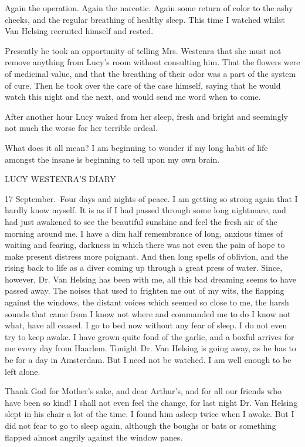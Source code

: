 Again the operation. Again the narcotic. Again some return of color to the ashy cheeks, and the regular breathing of healthy sleep. This time I watched whilst Van Helsing recruited himself and rested. 

Presently he took an opportunity of telling Mrs. Westenra that she must not remove anything from Lucy's room without consulting him. That the flowers were of medicinal value, and that the breathing of their odor was a part of the system of cure. Then he took over the care of the case himself, saying that he would watch this night and the next, and would send me word when to come. 

After another hour Lucy waked from her sleep, fresh and bright and seemingly not much the worse for her terrible ordeal. 

What does it all mean? I am beginning to wonder if my long habit of life amongst the insane is beginning to tell upon my own brain. 

LUCY WESTENRA'S DIARY 

17 September.--Four days and nights of peace. I am getting so strong again that I hardly know myself. It is as if I had passed through some long nightmare, and had just awakened to see the beautiful sunshine and feel the fresh air of the morning around me. I have a dim half remembrance of long, anxious times of waiting and fearing, darkness in which there was not even the pain of hope to make present distress more poignant. And then long spells of oblivion, and the rising back to life as a diver coming up through a great press of water. Since, however, Dr. Van Helsing has been with me, all this bad dreaming seems to have passed away. The noises that used to frighten me out of my wits, the flapping against the windows, the distant voices which seemed so close to me, the harsh sounds that came from I know not where and commanded me to do I know not what, have all ceased. I go to bed now without any fear of sleep. I do not even try to keep awake. I have grown quite fond of the garlic, and a boxful arrives for me every day from Haarlem. Tonight Dr. Van Helsing is going away, as he has to be for a day in Amsterdam. But I need not be watched. I am well enough to be left alone. 

Thank God for Mother's sake, and dear Arthur's, and for all our friends who have been so kind! I shall not even feel the change, for last night Dr. Van Helsing slept in his chair a lot of the time. I found him asleep twice when I awoke. But I did not fear to go to sleep again, although the boughs or bats or something flapped almost angrily against the window panes. 


